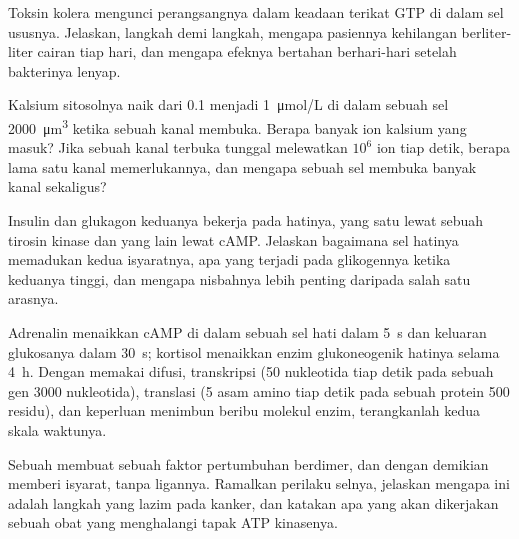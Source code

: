 \begin{exercise}[$\star\star$]\label{exo:b2:cell-signalling:7}
Toksin kolera mengunci  perangsangnya dalam keadaan terikat
GTP di dalam sel ususnya. Jelaskan, langkah demi langkah, mengapa
pasiennya kehilangan berliter-liter cairan tiap hari, dan mengapa
efeknya bertahan berhari-hari setelah bakterinya lenyap.
\end{exercise}

\begin{exercise}[$\star\star$]\label{exo:b2:cell-signalling:8}
Kalsium sitosolnya naik dari \qty{0.1}{} menjadi \qty{1}{\micro mol/L}
di dalam sebuah sel \qty{2000}{\micro m^3} ketika sebuah kanal membuka.
Berapa banyak ion kalsium yang masuk? Jika sebuah kanal terbuka tunggal
melewatkan $10^{6}$ ion tiap detik, berapa lama satu kanal
memerlukannya, dan mengapa sebuah sel membuka banyak kanal sekaligus?
\end{exercise}

\begin{exercise}[$\star\star$]\label{exo:b2:cell-signalling:9}
Insulin dan glukagon keduanya bekerja pada hatinya, yang satu lewat
sebuah tirosin kinase dan yang lain lewat cAMP. Jelaskan bagaimana sel
hatinya memadukan kedua isyaratnya, apa yang terjadi pada glikogennya
ketika keduanya tinggi, dan mengapa nisbahnya lebih penting daripada
salah satu arasnya.
\end{exercise}

\begin{exercise}[$\star\star\star$]\label{exo:b2:cell-signalling:10}
Adrenalin menaikkan cAMP di dalam sebuah sel hati dalam \qty{5}{s} dan
keluaran glukosanya dalam \qty{30}{s}; kortisol menaikkan enzim
glukoneogenik hatinya selama \qty{4}{h}. Dengan memakai difusi,
transkripsi (\qty{50}{} nukleotida tiap detik pada sebuah gen
\qty{3000}{} nukleotida), translasi (\qty{5}{} asam amino tiap detik
pada sebuah protein \num{500} residu), dan keperluan menimbun beribu
molekul enzim, terangkanlah kedua skala waktunya.
\end{exercise}

\begin{exercise}[$\star\star\star$]\label{exo:b2:cell-signalling:11}
Sebuah  membuat sebuah  faktor
pertumbuhan berdimer, dan dengan demikian memberi isyarat, tanpa
ligannya. Ramalkan perilaku selnya, jelaskan mengapa ini adalah langkah
yang lazim pada kanker, dan katakan apa yang akan dikerjakan sebuah
obat yang menghalangi tapak ATP kinasenya.
\end{exercise}

